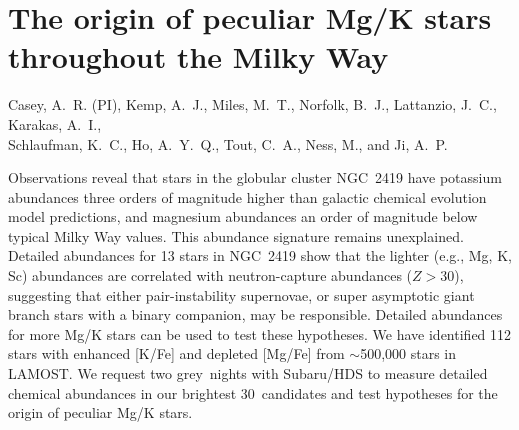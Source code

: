 \documentclass[12pt]{report}
\newcommand{\NumStars}{30}
\newcommand{\NumNights}{two grey}
\begin{document}
\section*{The origin of peculiar Mg/K stars throughout the Milky Way}\vspace{-\parskip}

\begin{center}
Casey, A.~R. (PI), Kemp, A.~J., Miles, M.~T., Norfolk, B.~J., Lattanzio, J.~C., Karakas, A.~I.,\\ Schlaufman, K.~C., Ho, A.~Y.~Q., Tout, C.~A., Ness, M., and Ji, A.~P.
\end{center}

\newcommand{\refnum}[1]{[#1]}

\begin{highlightbox}
Observations reveal that stars in the globular cluster NGC~2419 have potassium abundances three orders of magnitude higher than galactic chemical evolution model predictions, and magnesium abundances an order of magnitude below typical Milky Way values. This abundance signature remains unexplained. Detailed abundances for 13 stars in NGC~2419 show that the lighter (e.g., Mg, K, Sc) abundances are correlated with neutron-capture abundances ($Z > 30$), suggesting that either pair-instability supernovae, or super asymptotic giant branch stars with a binary companion, may be responsible. Detailed abundances for more Mg/K stars can be used to test these hypotheses. We have identified 112 stars with  enhanced [K/Fe] and depleted [Mg/Fe] from $\sim$500,000 stars in LAMOST. We request \NumNights\ nights with Subaru/HDS to measure detailed chemical abundances in our brightest \NumStars\ candidates and test hypotheses for the origin of peculiar Mg/K stars.
\end{highlightbox}\vspace{-\parskip}
\end{document}
